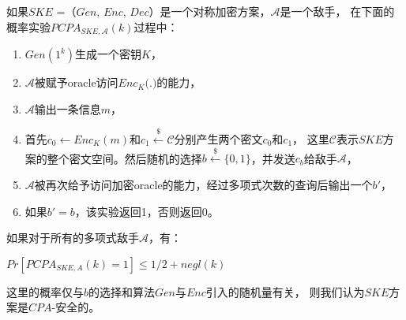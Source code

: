 \begin{defn}[$PCPA$-安全]
\label{defn:pcpa_security}
如果$SKE$ =（$Gen$, $Enc$, $Dec$）是一个对称加密方案，$\mathcal{A}$是一个敌手，
在下面的概率实验$PCPA_{SKE,\mathcal{A}}(k)$过程中：
\begin{enumerate}
  \item $Gen(1^k )$生成一个密钥$K$，
	
  \item $\mathcal{A}$被赋予oracle访问$Enc_K($.$)$的能力，
	
  \item $\mathcal{A}$输出一条信息$m$，
	
  \item 首先$c_0 \leftarrow Enc_K(m)$和$c_1 \overset{\$} \leftarrow \mathcal{C}$分别产生两个密文$c_0$和$c_1$，
  这里$\mathcal{C}$表示$SKE$方案的整个密文空间。然后随机的选择$b \overset{\$}\leftarrow \{0,1\}$，并发送$c_b$给敌手$\mathcal{A}$，
	
  \item $\mathcal{A}$被再次给予访问加密oracle的能力，经过多项式次数的查询后输出一个$b'$，
	
  \item 如果$b'=b$，该实验返回1，否则返回0。

  \end{enumerate}

  如果对于所有的多项式敌手$\mathcal{A}$，有：
  \begin{center}
  $Pr[PCPA_{SKE,A}(k)=1] \leq 1/2 + negl(k)$
  \end{center}
  这里的概率仅与$b$的选择和算法$Gen$与$Enc$引入的随机量有关，
  则我们认为$SKE$方案是$CPA$-安全的。
\end{defn}


